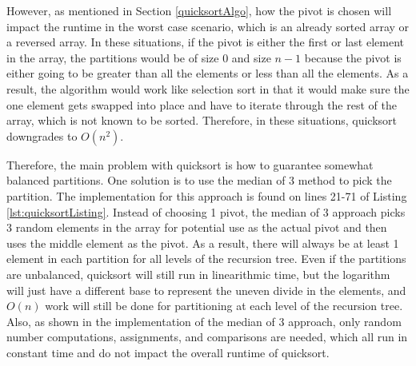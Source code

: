\documentclass[letterpaper, 10pt,DIV=13]{scrartcl}
\numberwithin{equation}{section} %
\numberwithin{figure}{section} %
\numberwithin{table}{section} %
\begin{document}
However, as mentioned in Section \ref{quicksortAlgo}, how the pivot is chosen will impact the runtime in the worst case scenario, which is an already sorted array or a reversed array. In these situations, if the pivot is either the first or last element in the array, the partitions would be of size 0 and size $n - 1$ because the pivot is either going to be greater than all the elements or less than all the elements. As a result, the algorithm would work like selection sort in that it would make sure the one element gets swapped into place and have to iterate through the rest of the array, which is not known to be sorted. Therefore, in these situations, quicksort downgrades to $O(n^2)$.

Therefore, the main problem with quicksort is how to guarantee somewhat balanced partitions. One solution is to use the median of 3 method to pick the partition. The implementation for this approach is found on lines 21-71 of Listing \ref{lst:quicksortListing}. Instead of choosing 1 pivot, the median of 3 approach picks 3 random elements in the array for potential use as the actual pivot and then uses the middle element as the pivot. As a result, there will always be at least 1 element in each partition for all levels of the recursion tree. Even if the partitions are unbalanced, quicksort will still run in linearithmic time, but the logarithm will just have a different base to represent the uneven divide in the elements, and $O(n)$ work will still be done for partitioning at each level of the recursion tree. Also, as shown in the implementation of the median of 3 approach, only random number computations, assignments, and comparisons are needed, which all run in constant time and do not impact the overall runtime of quicksort.
\end{document}
